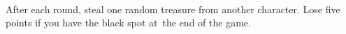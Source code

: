\begin{minipage}{1.5cm}
\end{minipage}
\ 
\begin{minipage}{6cm}
\raggedright
After each round, steal one random treasure from another character. Lose five points if you have the black spot at~the end of the game.
\end{minipage}

